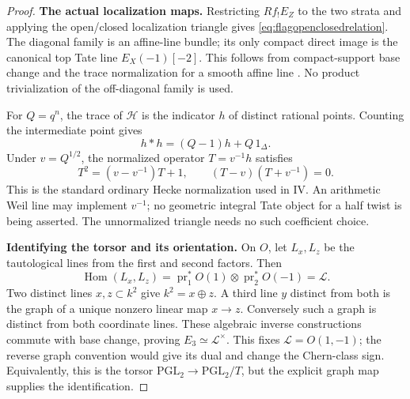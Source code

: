 \documentclass[11pt,a4paper]{article}
\theoremstyle{named}\newtheorem{finding}{Finding}[section]
\theoremstyle{definition}\newtheorem{definition}[finding]{Definition}
\theoremstyle{remark}\newtheorem{remark}[finding]{Remark}
\begin{document}
\begin{proof}
\par\smallskip\noindent\textbf{The actual localization maps.}\quad
Restricting \(Rf_!E_Z\) to the two strata and applying the
open/closed localization triangle gives
\eqref{eq:flagopenclosedrelation}.
The diagonal family is an affine-line bundle; its only compact
direct image is the canonical top Tate line
\(E_X(-1)[-2]\).
This follows from compact-support base change and the trace
normalization for a smooth affine line
\cite[Proposition~18.4(b), pp.~121--122; Theorem~24.1(a),(b),
p.~144]{Milne}.
No product trivialization of the off-diagonal family is used.

For \(Q=q^n\), the trace of \(\mathcal H\) is the indicator
\(h\) of distinct rational points. Counting the intermediate
point gives
\begin{equation}\label{eq:unnormalizedflagHecke}
                         h*h=(Q-1)h+Q\,1_\Delta.
\end{equation}
Under \(v=Q^{1/2}\), the normalized operator \(T=v^{-1}h\)
satisfies
\[
 T^2=(v-v^{-1})T+1,\qquad (T-v)(T+v^{-1})=0.
\]
This is the standard ordinary Hecke normalization used in IV.
An arithmetic Weil line may implement \(v^{-1}\); no geometric
integral Tate object for a half twist is being asserted.
The unnormalized triangle needs no such coefficient choice.

\par\smallskip\noindent\textbf{Identifying the torsor and its orientation.}\quad
On \(O\), let \(L_x,L_z\) be the tautological lines from the
first and second factors. Then
\[
 \operatorname{Hom}(L_x,L_z)
      =\operatorname{pr}_1^*O(1)\otimes
        \operatorname{pr}_2^*O(-1)=\mathcal L.
\]
Two distinct lines \(x,z\subset k^2\) give \(k^2=x\oplus z\).
A third line \(y\) distinct from both is the graph of a unique
nonzero linear map \(x\to z\). Conversely such a graph is
distinct from both coordinate lines. These algebraic inverse
constructions commute with base change, proving
\(E_3\simeq\mathcal L^\times\).
This fixes \(\mathcal L=O(1,-1)\); the reverse graph convention
would give its dual and change the Chern-class sign.
Equivalently, this is the torsor
\(\mathrm{PGL}_2\to\mathrm{PGL}_2/T\), but the explicit graph
map supplies the identification.


\end{proof}
\end{document}
